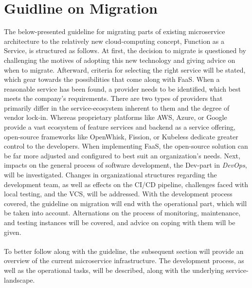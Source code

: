 \documentclass[11pt]{article}
\begin{document}
\section{Guidline on Migration}
The below-presented guideline for migrating parts of existing microservice architecture to the relatively new cloud-computing concept, Function as a Service, is structured as follows. At first, the decision to migrate is questioned by challenging the motives of adopting this new technology and giving advice on when to migrate. Afterward, criteria for selecting the right service will be stated, which gear towards the possibilities that come along with FaaS. When a reasonable service has been found, a provider needs to be identified, which best meets the company's requirements. There are two types of providers that primarily differ in the service-ecosystem inherent to them and the degree of vendor lock-in. Whereas proprietary platforms like AWS, Azure, or Google provide a vast ecosystem of feature services and backend as a service offering, open-source frameworks like OpenWhisk, Fission, or Kubeless dedicate greater control to the developers. When implementing FaaS, the open-source solution can be far more adjusted and configured to best suit an organization's needs. Next, impacts on the general process of software development, the \glqq Dev\grqq{}-part in \textit{DevOps}, will be investigated. Changes in organizational structures regarding the development team, as well as effects on the CI/CD pipeline, challenges faced with local testing, and the VCS, will be addressed. With the development process covered, the guideline on migration will end with the operational part, which will be taken into account. Alternations on the process of monitoring, maintenance, and testing instances will be covered, and advice on coping with them will be given.\\\\ To better follow along with the guideline, the subsequent section will provide an overview of the current microservice infrastructure. The development process, as well as the operational tasks, will be described, along with the underlying service-landscape.
\end{document}
